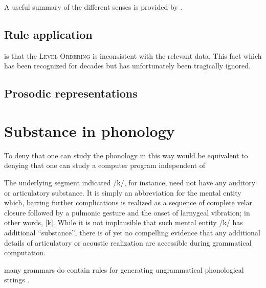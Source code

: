\citet{SPE}
\citet{Halle1993}

A useful summary of the different senses is provided by \citet[chap.~1]{Blaho2008}.
\subsection{Rule application}

is that the
\textsc{Level Ordering} \citep{Siegel1974} is inconsistent with the relevant data. This fact which has been recognized for decades \citep{Aronoff1976} but has unfortunately been tragically ignored.

\subsection{Prosodic representations}



\section{Substance in phonology}

To deny that one can study the phonology in this way would be equivalent to denying that one can study a computer program independent of

The underlying segment indicated /k/, for instance, need not have any auditory or articulatory substance. 
It is simply an abbreviation for the mental entity which, barring further complications is realized as a sequence of complete velar closure followed by a pulmonic gesture and the onset of larnygeal vibration; in other words, [k].
While it is not implausible that such mental entity /k/ has additional ``substance'', there is of yet no compelling evidence that any additional details of articulatory or acoustic realization are accessible during grammatical computation.


many grammars do contain rules for generating ungrammatical phonological strings \citep[19]{Bauer2001}.
